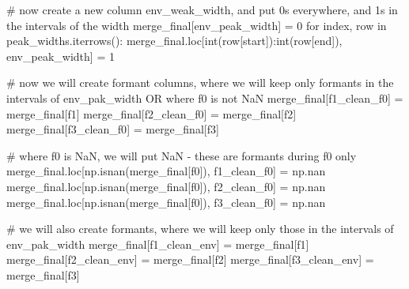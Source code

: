 \documentclass[
  letterpaper,
  DIV=11,
  numbers=noendperiod]{scrreprt}
\newenvironment{Shaded}{\begin{snugshade}}{\end{snugshade}}
\newcommand{\BuiltInTok}[1]{\textcolor[rgb]{0.00,0.23,0.31}{#1}}
\newcommand{\CommentTok}[1]{\textcolor[rgb]{0.37,0.37,0.37}{#1}}
\newcommand{\ControlFlowTok}[1]{\textcolor[rgb]{0.00,0.23,0.31}{#1}}
\newcommand{\DecValTok}[1]{\textcolor[rgb]{0.68,0.00,0.00}{#1}}
\newcommand{\KeywordTok}[1]{\textcolor[rgb]{0.00,0.23,0.31}{#1}}
\newcommand{\NormalTok}[1]{\textcolor[rgb]{0.00,0.23,0.31}{#1}}
\newcommand{\OperatorTok}[1]{\textcolor[rgb]{0.37,0.37,0.37}{#1}}
\newcommand{\StringTok}[1]{\textcolor[rgb]{0.13,0.47,0.30}{#1}}
\begin{document}
\begin{Shaded}
\begin{Highlighting}[]
    \CommentTok{\# now create a new column env\_weak\_width, and put 0s everywhere, and 1s in the intervals of the width}
\NormalTok{    merge\_final[}\StringTok{\textquotesingle{}env\_peak\_width\textquotesingle{}}\NormalTok{] }\OperatorTok{=} \DecValTok{0}
    \ControlFlowTok{for}\NormalTok{ index, row }\KeywordTok{in}\NormalTok{ peak\_widths.iterrows():}
\NormalTok{        merge\_final.loc[}\BuiltInTok{int}\NormalTok{(row[}\StringTok{\textquotesingle{}start\textquotesingle{}}\NormalTok{]):}\BuiltInTok{int}\NormalTok{(row[}\StringTok{\textquotesingle{}end\textquotesingle{}}\NormalTok{]), }\StringTok{\textquotesingle{}env\_peak\_width\textquotesingle{}}\NormalTok{] }\OperatorTok{=} \DecValTok{1}

    \CommentTok{\# now we will create formant columns, where we will keep only formants in the intervals of env\_pak\_width OR where f0 is not NaN}
\NormalTok{    merge\_final[}\StringTok{\textquotesingle{}f1\_clean\_f0\textquotesingle{}}\NormalTok{] }\OperatorTok{=}\NormalTok{ merge\_final[}\StringTok{\textquotesingle{}f1\textquotesingle{}}\NormalTok{]}
\NormalTok{    merge\_final[}\StringTok{\textquotesingle{}f2\_clean\_f0\textquotesingle{}}\NormalTok{] }\OperatorTok{=}\NormalTok{ merge\_final[}\StringTok{\textquotesingle{}f2\textquotesingle{}}\NormalTok{]}
\NormalTok{    merge\_final[}\StringTok{\textquotesingle{}f3\_clean\_f0\textquotesingle{}}\NormalTok{] }\OperatorTok{=}\NormalTok{ merge\_final[}\StringTok{\textquotesingle{}f3\textquotesingle{}}\NormalTok{]}

    \CommentTok{\# where f0 is NaN, we will put NaN {-} these are formants during f0 only}
\NormalTok{    merge\_final.loc[np.isnan(merge\_final[}\StringTok{\textquotesingle{}f0\textquotesingle{}}\NormalTok{]), }\StringTok{\textquotesingle{}f1\_clean\_f0\textquotesingle{}}\NormalTok{] }\OperatorTok{=}\NormalTok{ np.nan}
\NormalTok{    merge\_final.loc[np.isnan(merge\_final[}\StringTok{\textquotesingle{}f0\textquotesingle{}}\NormalTok{]), }\StringTok{\textquotesingle{}f2\_clean\_f0\textquotesingle{}}\NormalTok{] }\OperatorTok{=}\NormalTok{ np.nan}
\NormalTok{    merge\_final.loc[np.isnan(merge\_final[}\StringTok{\textquotesingle{}f0\textquotesingle{}}\NormalTok{]), }\StringTok{\textquotesingle{}f3\_clean\_f0\textquotesingle{}}\NormalTok{] }\OperatorTok{=}\NormalTok{ np.nan}

    \CommentTok{\# we will also create formants, where we will keep only those in the intervals of env\_pak\_width}
\NormalTok{    merge\_final[}\StringTok{\textquotesingle{}f1\_clean\_env\textquotesingle{}}\NormalTok{] }\OperatorTok{=}\NormalTok{ merge\_final[}\StringTok{\textquotesingle{}f1\textquotesingle{}}\NormalTok{]}
\NormalTok{    merge\_final[}\StringTok{\textquotesingle{}f2\_clean\_env\textquotesingle{}}\NormalTok{] }\OperatorTok{=}\NormalTok{ merge\_final[}\StringTok{\textquotesingle{}f2\textquotesingle{}}\NormalTok{]}
\NormalTok{    merge\_final[}\StringTok{\textquotesingle{}f3\_clean\_env\textquotesingle{}}\NormalTok{] }\OperatorTok{=}\NormalTok{ merge\_final[}\StringTok{\textquotesingle{}f3\textquotesingle{}}\NormalTok{]}


\end{Highlighting}
\end{Shaded}
\end{document}
